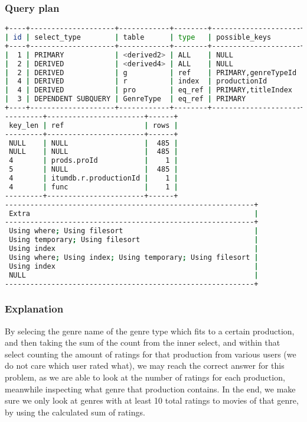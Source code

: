 \subsubsection{Query plan}
\begin{lstlisting}[language=bash]
+----+--------------------+------------+--------+---------------------+--------------+
| id | select_type        | table      | type   | possible_keys       | key          |
+----+--------------------+------------+--------+---------------------+--------------+
|  1 | PRIMARY            | <derived2> | ALL    | NULL                | NULL         |
|  2 | DERIVED            | <derived4> | ALL    | NULL                | NULL         |
|  2 | DERIVED            | g          | ref    | PRIMARY,genreTypeId | PRIMARY      |
|  4 | DERIVED            | r          | index  | productionId        | productionId |
|  4 | DERIVED            | pro        | eq_ref | PRIMARY,titleIndex  | PRIMARY      |
|  3 | DEPENDENT SUBQUERY | GenreType  | eq_ref | PRIMARY             | PRIMARY      |
+----+--------------------+------------+--------+---------------------+--------------+
---------+-----------------------+------+
 key_len | ref                   | rows |
---------+-----------------------+------+
 NULL    | NULL                  |  485 |
 NULL    | NULL                  |  485 |
 4       | prods.proId           |    1 |
 5       | NULL                  |  485 |
 4       | itumdb.r.productionId |    1 |
 4       | func                  |    1 |
---------+-----------------------+------+
-----------------------------------------------------------+
 Extra                                                     |
-----------------------------------------------------------+
 Using where; Using filesort                               |
 Using temporary; Using filesort                           |
 Using index                                               |
 Using where; Using index; Using temporary; Using filesort |
 Using index                                               |
 NULL                                                      |
-----------------------------------------------------------+
\end{lstlisting}

\subsubsection{Explanation}
By selecing the genre name of the genre type which fits to a certain production, and then taking the sum of the count from the inner select, and within that select counting the amount of ratings for that production from various users (we do not care which user rated what), we may reach the correct answer for this problem, as we are able to look at the number of ratings for each production, meanwhile inspecting what genre that production contains. In the end, we make sure we only look at genres with at least 10 total ratings to movies of that genre, by using the calculated sum of ratings.


